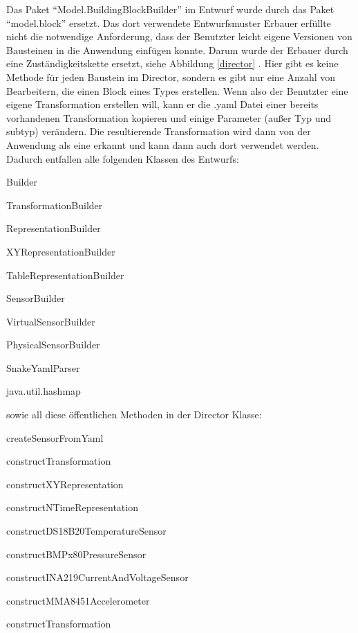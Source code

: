 \documentclass[parskip=full]{scrartcl}
\begin{document}
Das Paket "`Model.BuildingBlockBuilder"' im Entwurf wurde durch das Paket "`model.block"' ersetzt. Das dort verwendete Entwurfsmuster Erbauer erfüllte nicht die notwendige Anforderung, dass der Benutzter leicht eigene Versionen von Bausteinen in die Anwendung einfügen konnte. Darum wurde der Erbauer durch eine Zuständigkeitskette ersetzt, siehe Abbildung \ref{director} . Hier gibt es keine Methode für jeden Baustein im Director, sondern es gibt nur eine Anzahl von Bearbeitern, die einen Block eines Types erstellen. Wenn also der Benutzter eine eigene Transformation erstellen will, kann er die .yaml Datei einer bereits vorhandenen Transformation kopieren und einige Parameter (außer Typ und subtyp) verändern. Die resultierende Transformation wird dann von der Anwendung als eine erkannt und kann dann auch dort verwendet werden.
Dadurch entfallen alle folgenden Klassen des Entwurfs:

\begin{description}
\item{} Builder
\item{} TransformationBuilder
\item{} RepresentationBuilder
\item{} XYRepresentationBuilder
\item{} TableRepresentationBuilder
\item{} SensorBuilder
\item{} VirtualSensorBuilder
\item{} PhysicalSensorBuilder
\item{} SnakeYamlParser
\item{} java.util.hashmap
\end{description}

sowie all diese öffentlichen Methoden in der Director Klasse:

\begin{description}
\item{} createSensorFromYaml
\item{} constructTransformation
\item{} constructXYRepresentation
\item{} constructNTimeRepresentation
\item{} constructDS18B20TemperatureSensor
\item{} constructBMPx80PressureSensor
\item{} constructINA219CurrentAndVoltageSensor
\item{} constructMMA8451Accelerometer
\item{} constructTransformation

\end{description}
\end{document}

